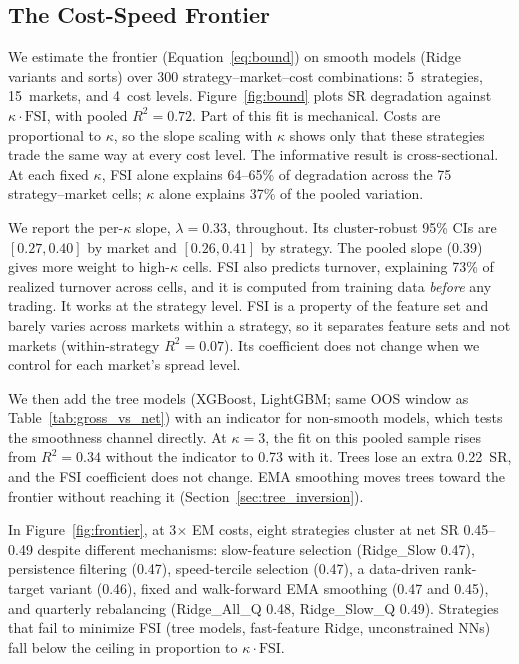 \documentclass[sigconf,balance=false]{acmart}
\begin{document}
\subsection{The Cost-Speed Frontier}
\label{sec:fsi_results}

We estimate the frontier (Equation~\ref{eq:bound}) on smooth models
(Ridge variants and sorts) over 300 strategy--market--cost
combinations: 5~strategies, 15~markets, and 4~cost levels.
Figure~\ref{fig:bound} plots SR degradation against
$\kappa \cdot \text{FSI}$, with pooled $R^2 = 0.72$. Part of this fit
is mechanical. Costs are proportional to $\kappa$, so the slope
scaling with $\kappa$ shows only that these strategies trade the same
way at every cost level. The informative result is cross-sectional.
At each fixed $\kappa$, FSI alone explains 64--65\% of degradation
across the 75 strategy--market cells; $\kappa$ alone explains 37\% of
the pooled variation.

We report the per-$\kappa$ slope, $\lambda = 0.33$, throughout. Its
cluster-robust 95\% CIs are $[0.27, 0.40]$ by market and
$[0.26, 0.41]$ by strategy. The pooled slope (0.39) gives more weight
to high-$\kappa$ cells. FSI also predicts turnover, explaining 73\% of
realized turnover across cells, and it is computed from training data
\emph{before} any trading. It works at the strategy level. FSI is a
property of the feature set and barely varies across markets within a
strategy, so it separates feature sets and not markets
(within-strategy $R^2 = 0.07$). Its coefficient does not change when
we control for each market's spread level.

We then add the tree models (XGBoost, LightGBM; same OOS window as
Table~\ref{tab:gross_vs_net}) with an indicator for non-smooth models,
which tests the smoothness channel directly. At $\kappa = 3$, the fit
on this pooled sample rises from $R^2 = 0.34$ without the indicator
to 0.73 with it. Trees lose an extra 0.22~SR, and the FSI coefficient
does not change. EMA smoothing moves trees toward the frontier without
reaching it (Section~\ref{sec:tree_inversion}).

In Figure~\ref{fig:frontier}, at 3$\times$ EM costs, eight strategies
cluster at net SR 0.45--0.49 despite different mechanisms: slow-feature selection (Ridge\_Slow
0.47), persistence filtering (0.47), speed-tercile selection (0.47),
a data-driven rank-target variant (0.46), fixed and walk-forward EMA
smoothing (0.47 and 0.45), and quarterly rebalancing (Ridge\_All\_Q
0.48, Ridge\_Slow\_Q 0.49). Strategies that fail to minimize FSI (tree models,
fast-feature Ridge, unconstrained NNs) fall below the ceiling in
proportion to $\kappa \cdot \text{FSI}$.
\end{document}
